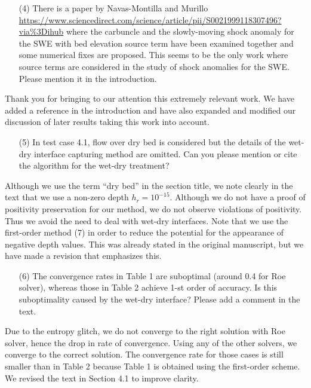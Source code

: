 \documentclass[english,11pt]{article}
\begin{document}
\bigskip
{\color{OliveGreen}
  \begin{itemize}
  \item[(4)]
    There is a paper by Navas-Montilla and Murillo 
    \url{https://www.sciencedirect.com/science/article/pii/S0021999118307496?via\%3Dihub}
    where the carbuncle and the slowly-moving shock anomaly for the SWE with bed elevation source term 
    have been examined together and some numerical fixes are proposed. This seems to be the only work 
    where source terms are considered in the study of shock anomalies for the SWE. 
    Please mention it in the introduction.
  \end{itemize}
}
\noindent
Thank you for bringing to our attention this extremely relevant work.  We have added a reference in
the introduction and have also expanded and modified our discussion of later results taking
this work into account.

\bigskip
{\color{OliveGreen}
  \begin{itemize}
  \item[(5)]
    In test case 4.1, flow over dry bed is considered but the details of the wet-dry interface 
    capturing method are omitted. Can you please mention or cite the algorithm for the wet-dry treatment?
  \end{itemize}
}
\noindent
Although we use the term ``dry bed'' in the section title, we note clearly in the text that we
use a non-zero depth $h_r=10^{-15}$.  Although we do not have a proof of positivity preservation
for our method, we do not observe violations of positivity.  Thus we avoid the
need to deal with wet-dry interfaces.  Note that we use the first-order method
(7) in order to reduce the potential for the appearance of negative depth
values.  This was already stated in the original manuscript, but we have made a revision
that emphasizes this.


\bigskip
{\color{OliveGreen}
  \begin{itemize}
  \item[(6)]
    The convergence rates in Table 1 are suboptimal (around 0.4 for Roe solver), 
    whereas those in Table 2 achieve 1-st order of accuracy. Is this suboptimality caused by 
    the wet-dry interface? Please add a comment in the text.
  \end{itemize}
}
\noindent
Due to the entropy glitch, we do not converge to the right solution with Roe solver,
hence the drop in rate of convergence.
Using any of the other solvers, we converge to the correct solution. The convergence rate
for those cases is still smaller than in Table 2 because Table 1 is obtained using the first-order scheme. 
We revised the text in Section 4.1 to improve clarity. 
\end{document}
